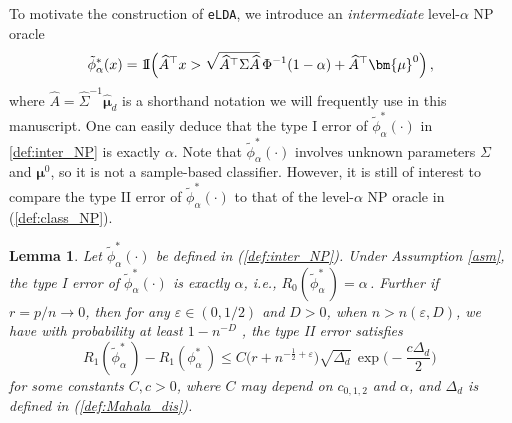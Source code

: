 \documentclass[12pt]{article}
\numberwithin{equation}{section}
\newtheorem{lem}{Lemma}
\newtheorem{thm}{Theorem}
\theoremstyle{remark}
\newcommand{\p}{{\rm I}\kern-0.18em{\rm P}}
\newcommand{\1}{{\rm 1}\kern-0.24em{\rm I}}
\begin{document}
To motivate the construction of \verb+eLDA+, we introduce an \textit{intermediate} level-$\alpha$ NP oracle 
\begin{align} \label{def:inter_NP}
\tilde{\phi}_\alpha^*(x)= \1 \Big( \widehat{A} ^{\top} x > \sqrt{\widehat{A} ^{\top} \Sigma \widehat{A} } \, \Phi^{-1}(1-\alpha) +\widehat{A} ^{\top} {\bm{\mu}}^0\Big)\,,
\end{align}
where $\widehat A= \widehat \Sigma^{-1} \hat {\bm{\mu}}_d$ is a shorthand notation we will frequently use in this manuscript. 
One can easily deduce that the type I error of $\tilde{\phi}_\alpha^*(\cdot)$ in \eqref{def:inter_NP} is exactly $\alpha$. Note that $\tilde{\phi}_\alpha^*(\cdot)$ involves unknown parameters $\Sigma$ and ${\bm{\mu}}^0$, so it is not a sample-based classifier. However, it is still of interest to compare the type II error of $\tilde{\phi}_\alpha^*(\cdot)$ to that of the level-$\alpha$ NP oracle in (\ref{def:class_NP}). 



\begin{lem}\label{thm:1}
Let $\tilde{\phi}_\alpha^*(\cdot)$ be defined in (\ref{def:inter_NP}). Under Assumption \ref{asm}, the type I error of $\tilde{\phi}_\alpha^*(\cdot)$ is exactly $\alpha$, i.e., $R_0(\tilde{\phi}_\alpha^*\, ) = \alpha\,$. Further if $r = p/n \to 0$, then for any $\varepsilon \in(0, 1/2)$ and $D>0$,  when $n>n(\varepsilon, D)$, we have with probability at least $1- n^{-D}$ ,
 the type II error satisfies  $$R_1(\tilde{\phi}_\alpha^*\, )-  R_1({\phi}_\alpha^*\, ) \leq  C  \Big(r + n^{-\frac12+ \varepsilon}\Big)\sqrt{\varDelta_d}\, \exp\Big(- \frac{c\varDelta_d}{2}\Big)\,$$
for some constants $C, c>0$,  where $C$ may depend on $c_{0,1,2}$ and $\alpha$, and $\varDelta_d$ is defined in (\ref{def:Mahala_dis}).
\end{lem}




%
%
%
%
\end{document}
